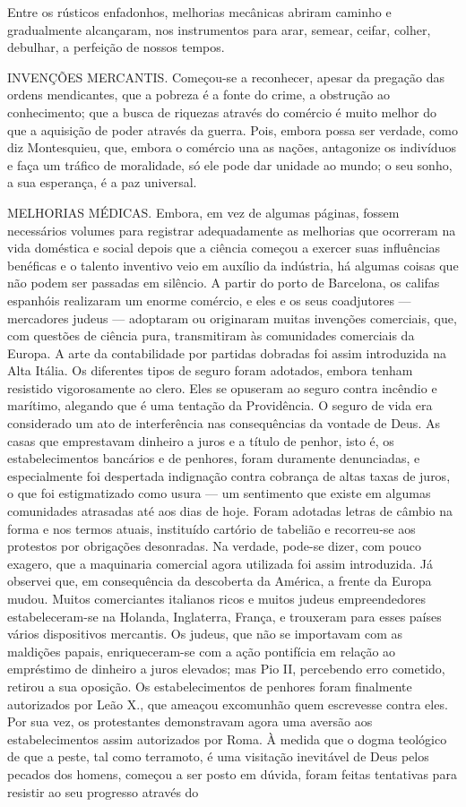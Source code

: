 \documentclass[11pt,a5paper,twoside,openany]{book}
\begin{document}
Entre os rústicos enfadonhos, melhorias mecânicas abriram caminho e gradualmente alcançaram, nos instrumentos para arar, semear, ceifar, colher, debulhar, a perfeição de nossos tempos.

INVENÇÕES MERCANTIS. Começou-se a reconhecer, apesar da pregação das ordens mendicantes, que a pobreza é a fonte do crime, a obstrução ao conhecimento; que a busca de riquezas através do comércio é muito melhor do que a aquisição de poder através da guerra. Pois, embora possa ser verdade, como diz Montesquieu, que, embora o comércio una as nações, antagonize os indivíduos e faça um tráfico de moralidade, só ele pode dar unidade ao mundo; o seu sonho, a sua esperança, é a paz universal.

MELHORIAS MÉDICAS. Embora, em vez de algumas páginas, fossem necessários volumes para registrar adequadamente as melhorias que ocorreram na vida doméstica e social depois que a ciência começou a exercer suas influências benéficas e o talento inventivo veio em auxílio da indústria, há algumas coisas que não podem ser passadas em silêncio. A partir do porto de Barcelona, ​​os califas espanhóis realizaram um enorme comércio, e eles e os seus coadjutores — mercadores judeus — adoptaram ou originaram muitas invenções comerciais, que, com questões de ciência pura, transmitiram às comunidades comerciais da Europa. A arte da contabilidade por partidas dobradas foi assim introduzida na Alta Itália. Os diferentes tipos de seguro foram adotados, embora tenham resistido vigorosamente ao clero. Eles se opuseram ao seguro contra incêndio e marítimo, alegando que é uma tentação da Providência. O seguro de vida era considerado um ato de interferência nas consequências da vontade de Deus. As casas que emprestavam dinheiro a juros e a título de penhor, isto é, os estabelecimentos bancários e de penhores, foram duramente denunciadas, e especialmente foi despertada indignação contra cobrança de altas taxas de juros, o que foi estigmatizado como usura — um sentimento que existe em algumas comunidades atrasadas até aos dias de hoje. Foram adotadas letras de câmbio na forma e nos termos atuais, instituído cartório de tabelião e recorreu-se aos protestos por obrigações desonradas. Na verdade, pode-se dizer, com pouco exagero, que a maquinaria comercial agora utilizada foi assim introduzida. Já observei que, em consequência da descoberta da América, a frente da Europa mudou. Muitos comerciantes italianos ricos e muitos judeus empreendedores estabeleceram-se na Holanda, Inglaterra, França, e trouxeram para esses países vários dispositivos mercantis. Os judeus, que não se importavam com as maldições papais, enriqueceram-se com a ação pontifícia em relação ao empréstimo de dinheiro a juros elevados; mas Pio II, percebendo erro cometido, retirou a sua oposição. Os estabelecimentos de penhores foram finalmente autorizados por Leão X., que ameaçou excomunhão quem escrevesse contra eles. Por sua vez, os protestantes demonstravam agora uma aversão aos estabelecimentos assim autorizados por Roma. À medida que o dogma teológico de que a peste, tal como terramoto, é uma visitação inevitável de Deus pelos pecados dos homens, começou a ser posto em dúvida, foram feitas tentativas para resistir ao seu progresso através do 
\end{document}
